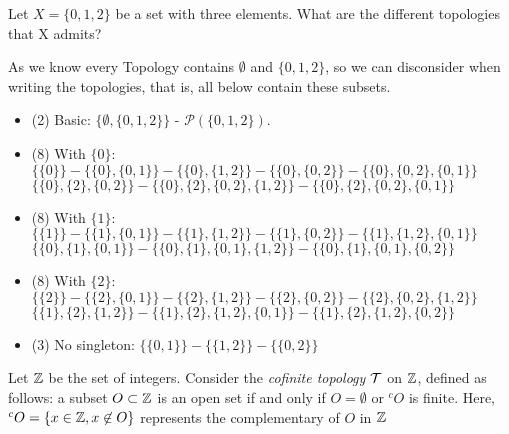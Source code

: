 \begin{exercise}
    Let $X = \{0, 1, 2\}$ be a set with three elements. What are the  different topologies that X admits?
\end{exercise}

As we know every Topology contains $\emptyset$ and $\{0,1,2\}$, so we can
disconsider when writing the topologies, that is, all below contain these
subsets. 

\begin{itemize}
    \item (2) Basic: $\{\emptyset, \{0,1,2\}\}$ - $\mathcal{P}(\{0,1,2\})$.  
    \item (8) With $\{0\}$: $\{\{0\}\} - \{\{0\}, \{0,1\}\} - \{\{0\}, \{1,2\}\} -
    \{\{0\}, \{0,2\}\} - \{\{0\}, \{0,2\}, \{0,1\}\}$ \\ 
    $\{\{0\}, \{2\}, \{0,2\}\}- \{\{0\}, \{2\}, \{0,2\}, \{1,2\}\} -
    \{\{0\}, \{2\}, \{0,2\}, \{0,1\}\}$

    \item (8) With $\{1\}$: $\{\{1\}\} - \{\{1\}, \{0,1\}\} - \{\{1\}, \{1,2\}\} -
    \{\{1\}, \{0,2\}\} - \{\{1\}, \{1,2\}, \{0,1\}\}$ \\
    $\{\{0\}, \{1\}, \{0,1\}\} - \{\{0\}, \{1\}, \{0,1\}, \{1,2\}\} -  \{\{0\}, \{1\}, \{0,1\}, \{0,2\}\}$

    \item (8) With $\{2\}$: $\{\{2\}\} - \{\{2\}, \{0,1\}\} - \{\{2\}, \{1,2\}\} -
    \{\{2\}, \{0,2\}\} - \{\{2\}, \{0,2\}, \{1,2\}\}$ \\
    $\{\{1\}, \{2\}, \{1,2\}\} - \{\{1\}, \{2\}, \{1,2\}, \{0,1\}\} - \{\{1\},
    \{2\}, \{1,2\}, \{0,2\}\}$ 
    
    \item (3) No singleton: $\{\{0,1\}\} - \{\{1,2\}\} - \{\{0,2\}\} $
\end{itemize}

\noindent\linia

\begin{exercise}
    Let $\mathbb{Z}$ be the set of integers. Consider the \textit{cofinite
    topology} $\mathcal{T}$ on $\mathbb{Z}$, defined as follows: a subset $O \subset
    \mathbb{Z}$ is an open set if and only if $O = \emptyset$ or $^c O$ is finite. Here, $^cO = \{x \in \mathbb{Z}, x \not\in O\}$ represents the complementary of $O$ in $\mathbb{Z}$
\end{exercise}

